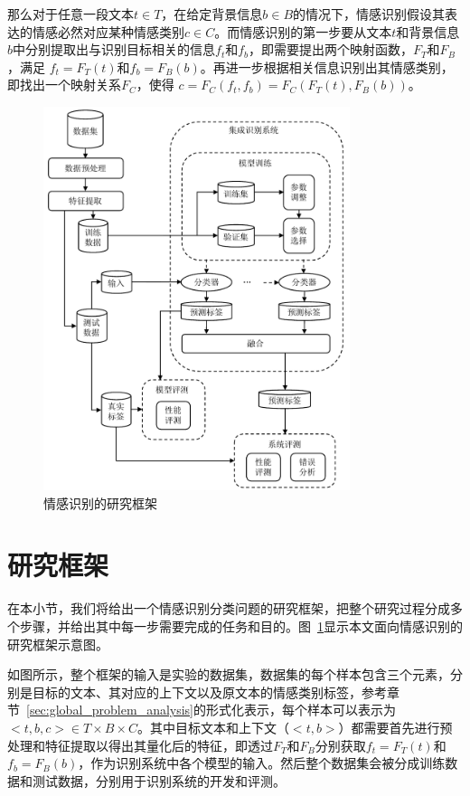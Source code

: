 那么对于任意一段文本$t \in T$，在给定背景信息$b \in B$的情况下，情感识别假设其表达的情感必然对应某种情感类别$c \in C$。而情感识别的第一步要从文本$t$和背景信息$b$中分别提取出与识别目标相关的信息$f_t$和$f_b$，即需要提出两个映射函数，$F_T$和$F_B$，满足 $f_t=F_T(t)$和$f_b=F_B(b)$。再进一步根据相关信息识别出其情感类别，即找出一个映射关系$F_C$，使得 $c=F_C(f_t, f_b)=F_C(F_T(t), F_B(b))$。

\begin{figure}[H]
  \centering
  \includegraphics[width=0.8\textwidth]{img/framework_v2.pdf}
  \caption{情感识别的研究框架}
  \label{fig:framework}
\end{figure}

\section{研究框架}
\label{sec:global_framework}

在本小节，我们将给出一个情感识别分类问题的研究框架，把整个研究过程分成多个步骤，并给出其中每一步需要完成的任务和目的。图~\ref{fig:framework}显示本文面向情感识别的研究框架示意图。

如图所示，整个框架的输入是实验的数据集，数据集的每个样本包含三个元素，分别是目标的文本、其对应的上下文以及原文本的情感类别标签，参考章节~\ref{sec:global_problem_analysis}的形式化表示，每个样本可以表示为 $<t, b, c> \in T \times B \times C$。其中目标文本和上下文（$<t, b>$）都需要首先进行预处理和特征提取以得出其量化后的特征，即透过$F_T$和$F_B$分别获取$f_t=F_T(t)$和$f_b=F_B(b)$，作为识别系统中各个模型的输入。然后整个数据集会被分成训练数据和测试数据，分别用于识别系统的开发和评测。

